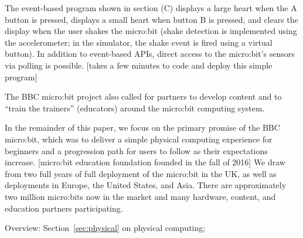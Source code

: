 The event-based program shown in section (C) displays a large heart when the
A button is pressed, displays a small heart when button B is pressed,
and clears the display when the user shakes the micro:bit (shake
detection is implemented using the accelerometer; in the simulator, the
shake event is fired using a virtual button). In addition to event-based
APIs, direct access to the micro:bit's sensors via polling is possible.
[takes a few minutes to code and deploy this simple program]

The BBC micro:bit project also called for partners to develop content
and to ``train the trainers'' (educators) around the micro:bit computing
system.


In the remainder of this paper, we focus on the primary promise
of the BBC micro:bit, which was to deliver a simple physical computing
experience for beginners and a progression path for users to follow
as their expectations increase. [micro:bit education foundation founded
in the fall of 2016]  We draw from two full years of 
full deployment of the micro:bit in the UK, as well as deployments
in Europe, the United States, and Asia.  There are approximately
two million micro:bits now in the market and many hardware,
content, and education partners participating. 



Overview: Section~\ref{sec:physical} on physical computing;
















